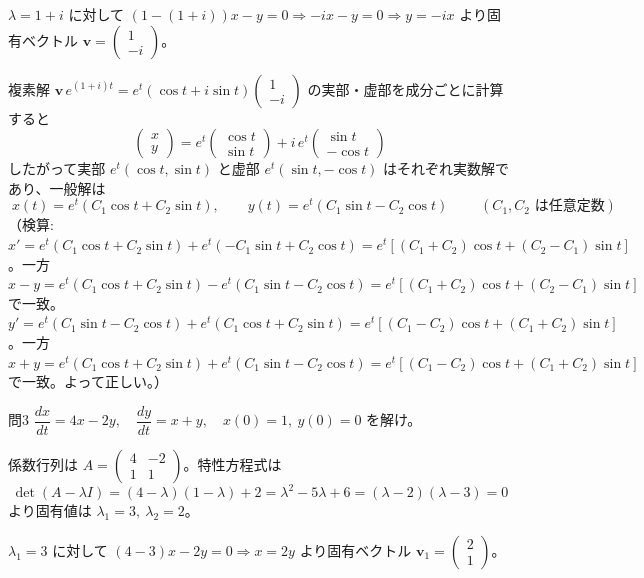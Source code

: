 \documentclass[a4paper,11pt]{article}
\begin{document}
\noindent
$\lambda = 1 + i$ に対して $(1 - (1+i))x - y = 0 \Rightarrow -ix - y = 0 \Rightarrow y = -ix$ より固有ベクトル $\mathbf{v} = \begin{pmatrix} 1 \\ -i \end{pmatrix}$。

\noindent
複素解 $\mathbf{v}\,e^{(1+i)t} = e^{t}(\cos t + i \sin t)\begin{pmatrix} 1 \\ -i \end{pmatrix}$ の実部・虚部を成分ごとに計算すると
\[
\begin{pmatrix} x \\ y \end{pmatrix}
= e^{t}\begin{pmatrix} \cos t \\ \sin t \end{pmatrix} + i\, e^{t}\begin{pmatrix} \sin t \\ -\cos t \end{pmatrix}
\]
したがって実部 $e^{t}(\cos t, \sin t)$ と虚部 $e^{t}(\sin t, -\cos t)$ はそれぞれ実数解であり、一般解は
\[
\boxed{\;
x(t) = e^{t}(C_{1}\cos t + C_{2}\sin t), \qquad
y(t) = e^{t}(C_{1}\sin t - C_{2}\cos t)
\;}
\qquad (C_{1}, C_{2} \text{ は任意定数})
\]
（検算: $x' = e^{t}(C_{1}\cos t+C_{2}\sin t) + e^{t}(-C_{1}\sin t+C_{2}\cos t) = e^{t}[(C_{1}+C_{2})\cos t+(C_{2}-C_{1})\sin t]$。一方 $x-y = e^{t}(C_{1}\cos t+C_{2}\sin t) - e^{t}(C_{1}\sin t-C_{2}\cos t) = e^{t}[(C_{1}+C_{2})\cos t+(C_{2}-C_{1})\sin t]$ で一致。$y' = e^{t}(C_{1}\sin t-C_{2}\cos t)+e^{t}(C_{1}\cos t+C_{2}\sin t) = e^{t}[(C_{1}-C_{2})\cos t+(C_{1}+C_{2})\sin t]$。一方 $x+y = e^{t}(C_{1}\cos t+C_{2}\sin t)+e^{t}(C_{1}\sin t-C_{2}\cos t) = e^{t}[(C_{1}-C_{2})\cos t+(C_{1}+C_{2})\sin t]$ で一致。よって正しい。）

\clearpage
\begin{mondaiboxS}{問3}
$\dfrac{dx}{dt} = 4x - 2y,\quad \dfrac{dy}{dt} = x + y,\quad x(0) = 1,\ y(0) = 0$ を解け。
\end{mondaiboxS}
\kaitou
係数行列は $A = \begin{pmatrix} 4 & -2 \\ 1 & 1 \end{pmatrix}$。特性方程式は
\[
\det(A - \lambda I) = (4-\lambda)(1-\lambda) + 2 = \lambda^{2} - 5\lambda + 6 = (\lambda-2)(\lambda-3) = 0
\]
より固有値は $\lambda_{1} = 3,\ \lambda_{2} = 2$。

\noindent
$\lambda_{1} = 3$ に対して $(4-3)x - 2y = 0 \Rightarrow x = 2y$ より固有ベクトル $\mathbf{v}_{1} = \begin{pmatrix} 2 \\ 1 \end{pmatrix}$。
\end{document}
